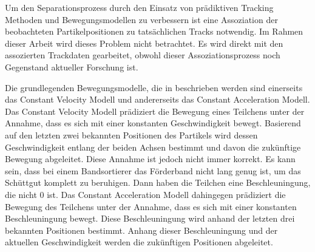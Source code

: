 Um den Separationsprozess durch den Einsatz von prädiktiven Tracking Methoden und Bewegungsmodellen zu verbessern ist eine Assoziation 
der beobachteten Partikelpositionen zu tatsächlichen Tracks notwendig. 
Im Rahmen dieser Arbeit wird dieses Problem nicht betrachtet. 
Es wird direkt mit den assozierten Trackdaten gearbeitet, 
obwohl dieser Assoziationsprozess noch Gegenstand aktueller Forschung ist.

Die grundlegenden Bewegungsmodelle, die in \cite{Pfaff2018} beschrieben werden sind 
einerseits das Constant Velocity Modell und andererseits das Constant Acceleration Modell.
Das Constant Velocity Modell prädiziert die Bewegung eines Teilchens unter der Annahme, dass es sich mit einer konstanten Geschwindigkeit bewegt.
Basierend auf den letzten zwei bekannten Positionen des Partikels wird dessen Geschwindigkeit entlang der beiden Achsen bestimmt 
und davon die zukünftige Bewegung abgeleitet.
Diese Annahme ist jedoch nicht immer korrekt.
Es kann sein, dass bei einem Bandsortierer das Förderband nicht lang genug ist, um das Schüttgut komplett zu beruhigen.
Dann haben die Teilchen eine Beschleuningung, die nicht 0 ist.
Das Constant Acceleration Modell dahingegen prädiziert die Bewegung des Teilchens unter der Annahme, dass es sich mit einer konstanten Beschleuningung bewegt.
Diese Beschleuningung wird anhand der letzten drei bekannten Positionen bestimmt.
Anhang dieser Beschleuningung und der aktuellen Geschwindigkeit werden die zukünftigen Positionen abgeleitet.


